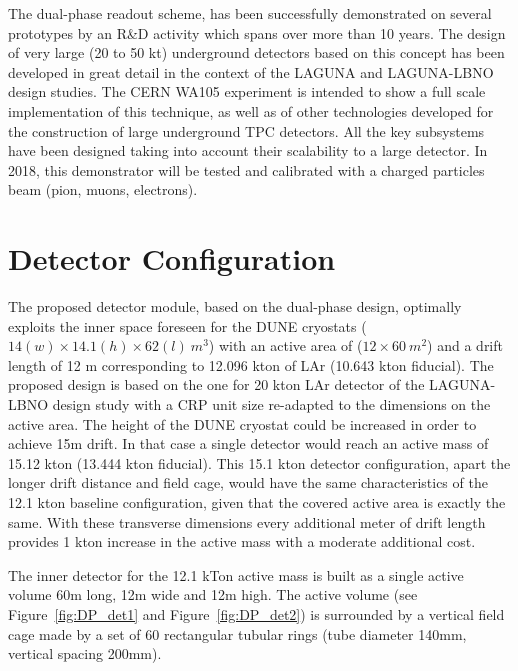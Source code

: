 The dual-phase readout scheme, has been successfully demonstrated on several prototypes  by an R\&D activity which spans over more than 10 years. The design of very large (20 to 50 kt) underground detectors based on this concept has been developed in great detail in the context of the LAGUNA and LAGUNA-LBNO design studies.  The CERN WA105 experiment is intended to show a full scale implementation of this technique, as well as of other technologies developed for the construction of large underground TPC detectors.  All the key subsystems have been designed taking into account their scalability to a large detector.  In 2018, this demonstrator will be tested and calibrated with a charged particles beam (pion, muons, electrons).


\section{Detector Configuration}


The proposed detector module, based on the dual-phase design, optimally exploits the inner space foreseen for the DUNE cryostats ($14 (w) \times 14.1 (h) \times 62  (l)~m^3$) with an active area of  ($12 \times 60 ~m^2$) and a drift length of 12 m corresponding to 12.096 kton of LAr (10.643 kton fiducial). The proposed design is based on the one for 20 kton LAr detector of the LAGUNA-LBNO design study with a CRP unit size re-adapted to the dimensions on the active area. The height of the DUNE cryostat could be increased in order to achieve 15m  drift. In that case a single detector would reach an active mass of 15.12 kton (13.444 kton fiducial).  This 15.1 kton  detector configuration, apart the longer drift distance and field cage, would have the same characteristics of the 12.1 kton baseline configuration, given that  the covered active area is exactly the same. With these transverse dimensions every additional meter of drift length provides 1 kton increase in the active mass with a moderate additional cost.

The inner detector for the 12.1 kTon active mass is built as a single active volume 60m long, 12m wide and 12m high. The active volume (see Figure~\ref{fig:DP_det1} and Figure~\ref{fig:DP_det2}) is surrounded by a vertical field cage made by a set of 60 rectangular tubular rings (tube diameter 140mm, vertical spacing 200mm).

